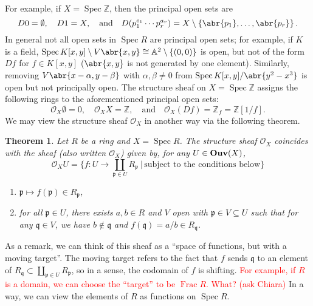 \documentclass[11pt,leqno]{article}
\newcommand{\sai}[1]{\textcolor{red}{#1}}
\theoremstyle{plain}
\newtheorem{theorem}[lem]{Theorem}
\theoremstyle{definition}
\numberwithin{equation}{section}
\numberwithin{lem}{section}
\newcommand{\cbr}[1]{\left\{#1\right\}}
\DeclareMathOperator{\Spec}{Spec}
\DeclareMathOperator{\Frac}{Frac}
\newcommand{\catname}[1]{{\normalfont\mathbf{#1}}}
\newcommand{\Ouv}{\catname{Ouv}}
\begin{document}
For example, if $X = \Spec \mathbb Z$, then the principal open sets are
\begin{equation}
    D0 = \emptyset,\quad D1 = X,\quad\text{and}\quad D(p_1^{e_1}\cdots p_r^{a_r}) = X\setminus\cbr{\abr{p_1},\dots,\abr{p_r}}.
\end{equation}
In general not all open sets in $\Spec R$ are principal open sets; for example, if $K$ is a field, $\Spec K[x,y]\setminus V\abr{x,y}\cong \mathbb A^2\setminus \cbr{(0,0)}$ is open, but not of the form $Df$ for $f\in K[x,y]$ ($\abr{x,y}$ is not generated by one element). Similarly, removing $V\abr{x-\alpha,y-\beta}$ with $\alpha,\beta\neq 0$ from $\Spec K[x,y]/\abr{y^2-x^3}$ is open but not principally open. The structure sheaf on $X = \Spec\mathbb Z$ assigns the following rings to the aforementioned principal open sets:
\begin{equation}
    \mathscr O_X\emptyset = 0,\quad \mathscr O_XX = \mathbb Z,\quad \text{and}\quad \mathscr O_X(Df) = \mathbb Z_f = \mathbb Z[1/f].
\end{equation}
We may view the structure sheaf $\mathscr O_X$ in another way via the following theorem.
\begin{theorem}
    Let $R$ be a ring and $X = \Spec R$. The structure sheaf $\mathscr O_X$ coincides with the sheaf (also written $\mathscr O_X$) given by, for any $U\in\Ouv(X)$,
    \begin{equation}
        \mathscr O_XU = \bigg\{f\colon U\to \coprod_{\mathfrak p\in U}R_{\mathfrak p}~\bigg\vert\, \text{subject to the conditions below}\bigg\}
    \end{equation}
    \begin{enumerate}
        \item $\mathfrak p\mapsto f(\mathfrak p)\in R_{\mathfrak p}$,
        \item for all $\mathfrak p\in U$, there exists $a,b\in R$ and $V$ open with $\mathfrak p\in V\subseteq U$ such that for any $\mathfrak q\in V$, we have $b\not\in \mathfrak q$ and $f(\mathfrak q) = a/b\in R_{\mathfrak q}$.
    \end{enumerate}
\end{theorem}
As a remark, we can think of this sheaf as a ``space of functions, but with a moving target''. The moving target refers to the fact that $f$ sends $\mathfrak q$ to an element of $R_{\mathfrak q}\subset \coprod_{\mathfrak p\in U}R_{\mathfrak p}$, so in a sense, the codomain of $f$ is shifting. \sai{For example, if $R$ is a domain, we can choose the ``target'' to be $\Frac R$. What? (ask Chiara)} In a way, we can view the elements of $R$ as functions on $\Spec R$.
\end{document}
